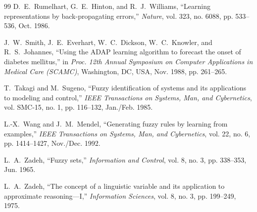 \documentclass[12pt,a4paper,oneside]{report}
\begin{document}
\begin{thebibliography}{99}
D.~E.~Rumelhart, G.~E.~Hinton, and R.~J.~Williams, ``Learning representations by back-propagating errors,'' \emph{Nature}, vol. 323, no. 6088, pp. 533--536, Oct. 1986.

J.~W.~Smith, J.~E.~Everhart, W.~C.~Dickson, W.~C.~Knowler, and R.~S.~Johannes, ``Using the ADAP learning algorithm to forecast the onset of diabetes mellitus,'' in \emph{Proc. 12th Annual Symposium on Computer Applications in Medical Care (SCAMC)}, Washington, DC, USA, Nov. 1988, pp. 261--265.

T.~Takagi and M.~Sugeno, ``Fuzzy identification of systems and its applications to modeling and control,'' \emph{IEEE Transactions on Systems, Man, and Cybernetics}, vol. SMC-15, no. 1, pp. 116--132, Jan./Feb. 1985.

L.-X.~Wang and J.~M.~Mendel, ``Generating fuzzy rules by learning from examples,'' \emph{IEEE Transactions on Systems, Man, and Cybernetics}, vol. 22, no. 6, pp. 1414--1427, Nov./Dec. 1992.

L.~A.~Zadeh, ``Fuzzy sets,'' \emph{Information and Control}, vol. 8, no. 3, pp. 338--353, Jun. 1965.

L.~A.~Zadeh, ``The concept of a linguistic variable and its application to approximate reasoning---I,'' \emph{Information Sciences}, vol. 8, no. 3, pp. 199--249, 1975.

\end{thebibliography}
\end{document}
